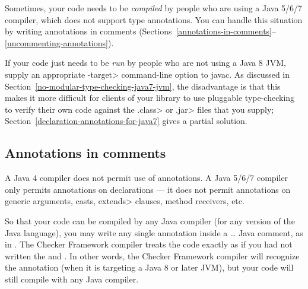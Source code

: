 Sometimes, your code needs to be \emph{compiled} by people who are using a
Java 5/6/7 compiler, which does not support type annotations.
You can handle this situation by writing annotations in comments (Sections~\ref{annotations-in-comments}--\ref{uncommenting-annotations}).

If your code just needs to be \emph{run} by people who are not using a Java
8 JVM, supply an appropriate \<-target> command-line option to javac.  As
discussed in Section~\ref{no-modular-type-checking-java7-jvm}, the
disadvantage is that this makes it more difficult for clients of your
library to use pluggable type-checking to verify their own code against the
\<.class> or \<.jar> files that you supply;
Section~\ref{declaration-annotations-for-java7} gives a partial solution.


\subsection{Annotations in comments\label{annotations-in-comments}}

A Java 4 compiler does not permit use of
annotations.
A Java 5/6/7 compiler only permits annotations on
declarations --- it does not permit annotations on generic arguments,
casts, \<extends> clauses, method receivers, etc.

So that your code can be compiled by any Java compiler (for any version of
the Java language), you may write any single annotation inside a
\code{/*}\ldots\code{*/} Java comment, as in .
The Checker Framework compiler treats the code exactly as if you had not written the
\code{/*} and \code{*/}.
In other words, the Checker Framework compiler will recognize the
annotation (when it is targeting a Java 8 or later JVM),
but your code will still compile with any Java compiler.



